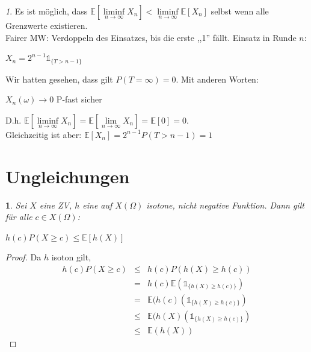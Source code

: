\documentclass[10pt,a4paper]{report}
\numberwithin{equation}{section}
\numberwithin{figure}{section}
\theoremstyle{plain}
\theoremstyle{definition}
\theoremstyle{remark}
\newtheorem{rem}[thm]{\protect\remarkname}
\theoremstyle{plain}
\newtheorem{prop}[thm]{\protect\propositionname}
\providecommand{\propositionname}{Satz}
\providecommand{\remarkname}{Bemerkung}
\newcommand{\1}{ \mathbb{1} } %
\begin{document}
\begin{rem}
  Es ist möglich, dass $\mathbb{E}[\liminf\limits_{n \to \infty} X_n] < \liminf\limits_{n \to \infty} \mathbb{E}[X_n]$ selbst wenn alle Grenzwerte existieren.\\
  Fairer MW: Verdoppeln des Einsatzes, bis die erste ,,1''
  fällt. Einsatz in Runde $n$:
  \begin{center}
    $X_n=2^{n-1}\1_{\{T>n-1\}}$
  \end{center}
  Wir hatten gesehen, dass gilt $P(T=\infty)=0$. Mit anderen Worten:
  \begin{center}
    $X_n(\omega) \to 0$ P-fast sicher
  \end{center}
  D.h. $\mathbb{E}[\liminf\limits_{n \to \infty} X_n]=\mathbb{E}[\lim\limits_{n \to \infty} X_n]=\mathbb{E}[0]=0$.\\
  Gleichzeitig ist aber: $\mathbb{E}[X_n]=2^{n-1}P(T>n-1)=1$\\
\end{rem}

\section{Ungleichungen}
\label{sec:ungleichungen}

\begin{prop} 
  Sei $X$ eine ZV, $h$ eine auf $X(\Omega)$ isotone, nicht negative
  Funktion. Dann gilt für alle $c \in X(\Omega)$:
  \begin{center}
    $h(c)P(X\geq c) \leq \mathbb{E}[h(X)]$
  \end{center}
\end{prop}
\begin{proof}
 Da $h$ isoton gilt,
  \begin{eqnarray*}
    h(c)P(X\geq c) &\leq & h(c)P(h(X)\geq h(c))\\
    &=& h(c) \mathbb{E}(\1_{\{h(X)\geq h(c)\}})\\
    &=& \mathbb{E}(h(c)(\1_{\{h(X)\geq h(c)\}})\\
    &\leq &\mathbb{E}(h(X)(\1_{\{h(X)\geq h(c)\}})\\
    &\leq &\mathbb{E}(h(X))
  \end{eqnarray*}
\end{proof}
\end{document}
